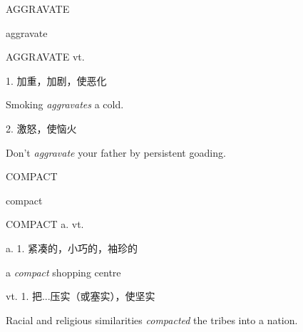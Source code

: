 \begin{flashcard}{
AGGRAVATE

aggravate
}
\begin{center}
AGGRAVATE vt. 
\end{center}
1. 加重，加剧，使恶化

Smoking \textit{aggravates} a cold.

2. 激怒，使恼火

Don't \textit{aggravate} your father by persistent goading.

\end{flashcard}
\begin{flashcard}{
COMPACT

compact
}
\begin{center}
COMPACT a.  vt. 
\end{center}
a. 1. 紧凑的，小巧的，袖珍的

a \textit{compact} shopping centre

vt. 1. 把...压实（或塞实），使坚实

Racial and religious similarities \textit{compacted} the tribes into a nation.

\end{flashcard}
